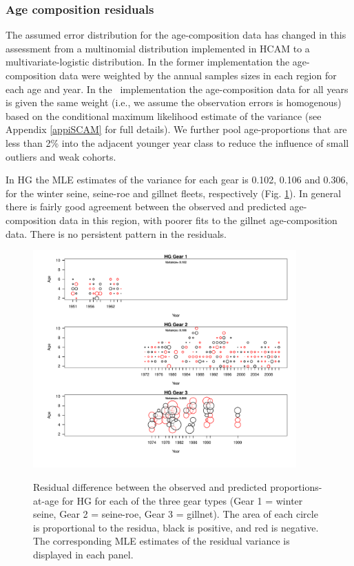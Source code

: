 \subsubsection{Age composition residuals}

The assumed error distribution for the age-composition data has changed in this assessment from a multinomial distribution implemented in HCAM to a multivariate-logistic distribution. In the former implementation the age-composition data were weighted by the annual samples sizes in each region for each age and year. In the \iscam\ implementation the age-composition data for all years is given the same weight (i.e., we assume the observation errors is homogenous) based on the conditional maximum likelihood estimate of the variance (see Appendix \ref{appiSCAM} for full details).  We further pool age-proportions that are less than 2\% into the adjacent younger year class to reduce the influence of small outliers and weak cohorts.

In HG the MLE estimates of the variance for each gear is 0.102, 0.106 and 0.306, for the winter seine, seine-roe and gillnet fleets, respectively (Fig. \ref{PartII:Results:figAgeCompHG}).  In general there is fairly good agreement between the observed and predicted age-composition data in this region, with poorer fits to the gillnet age-composition data.  There is no persistent pattern in the residuals. 

\begin{figure}
	\centering
	\includegraphics[width=0.9\textwidth]{../FIGS/qPriorFigs/iscam_fig_agecompsresid_HG.pdf}\\
	\caption{Residual difference between the observed and predicted proportions-at-age for HG for each of the three gear types (Gear 1 = winter seine, Gear 2 = seine-roe, Gear 3 = gillnet).  The area of each circle is proportional to the residua, black is positive, and red is negative.  The corresponding MLE estimates of the residual variance is displayed in each panel.}\label{PartII:Results:figAgeCompHG}
\end{figure}


